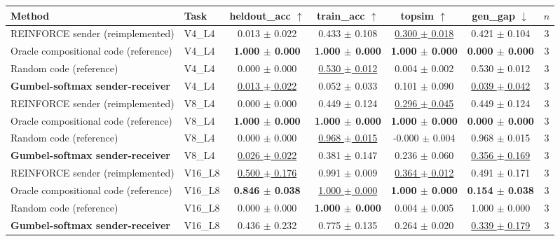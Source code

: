 \begin{tabular}{llccccc}
\toprule
Method & Task & heldout\_acc $\uparrow$ & train\_acc $\uparrow$ & topsim $\uparrow$ & gen\_gap $\downarrow$ & $n$ \\
\midrule
REINFORCE sender (reimplemented) & V4\_L4 & 0.013 $\pm$ 0.022 & 0.433 $\pm$ 0.108 & \underline{0.300 $\pm$ 0.018} & 0.421 $\pm$ 0.104 & 3 \\
Oracle compositional code (reference) & V4\_L4 & \textbf{1.000 $\pm$ 0.000} & \textbf{1.000 $\pm$ 0.000} & \textbf{1.000 $\pm$ 0.000} & \textbf{0.000 $\pm$ 0.000} & 3 \\
Random code (reference) & V4\_L4 & 0.000 $\pm$ 0.000 & \underline{0.530 $\pm$ 0.012} & 0.004 $\pm$ 0.002 & 0.530 $\pm$ 0.012 & 3 \\
\textbf{Gumbel-softmax sender-receiver} & V4\_L4 & \underline{0.013 $\pm$ 0.022} & 0.052 $\pm$ 0.033 & 0.101 $\pm$ 0.090 & \underline{0.039 $\pm$ 0.042} & 3 \\
\midrule
REINFORCE sender (reimplemented) & V8\_L4 & 0.000 $\pm$ 0.000 & 0.449 $\pm$ 0.124 & \underline{0.296 $\pm$ 0.045} & 0.449 $\pm$ 0.124 & 3 \\
Oracle compositional code (reference) & V8\_L4 & \textbf{1.000 $\pm$ 0.000} & \textbf{1.000 $\pm$ 0.000} & \textbf{1.000 $\pm$ 0.000} & \textbf{0.000 $\pm$ 0.000} & 3 \\
Random code (reference) & V8\_L4 & 0.000 $\pm$ 0.000 & \underline{0.968 $\pm$ 0.015} & -0.000 $\pm$ 0.004 & 0.968 $\pm$ 0.015 & 3 \\
\textbf{Gumbel-softmax sender-receiver} & V8\_L4 & \underline{0.026 $\pm$ 0.022} & 0.381 $\pm$ 0.147 & 0.236 $\pm$ 0.060 & \underline{0.356 $\pm$ 0.169} & 3 \\
\midrule
REINFORCE sender (reimplemented) & V16\_L8 & \underline{0.500 $\pm$ 0.176} & 0.991 $\pm$ 0.009 & \underline{0.364 $\pm$ 0.012} & 0.491 $\pm$ 0.171 & 3 \\
Oracle compositional code (reference) & V16\_L8 & \textbf{0.846 $\pm$ 0.038} & \underline{1.000 $\pm$ 0.000} & \textbf{1.000 $\pm$ 0.000} & \textbf{0.154 $\pm$ 0.038} & 3 \\
Random code (reference) & V16\_L8 & 0.000 $\pm$ 0.000 & \textbf{1.000 $\pm$ 0.000} & 0.004 $\pm$ 0.005 & 1.000 $\pm$ 0.000 & 3 \\
\textbf{Gumbel-softmax sender-receiver} & V16\_L8 & 0.436 $\pm$ 0.232 & 0.775 $\pm$ 0.135 & 0.264 $\pm$ 0.020 & \underline{0.339 $\pm$ 0.179} & 3 \\
\bottomrule
\end{tabular}
